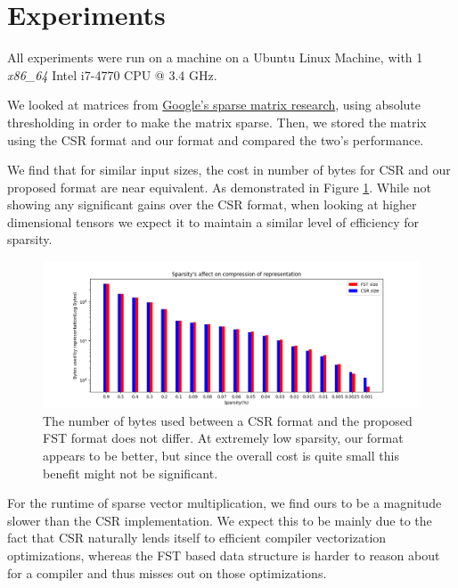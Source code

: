 \documentclass[12pt]{article}
\begin{document}

\section*{Experiments}

All experiments were run on a machine on a Ubuntu Linux Machine, with 1 \textit{x86\_64} Intel
i7-4770 CPU @ 3.4 GHz.

We looked at matrices from
\href{https://github.com/google-research/google-research/tree/master/state_of_sparsity}{Google's
sparse matrix research}, using absolute thresholding in order to make the matrix sparse. Then,
we stored the matrix using the CSR format and our format and compared the two's performance.

We find that for similar input sizes, the cost in number of bytes for CSR and our proposed
format are near equivalent. As demonstrated in Figure \ref{fig:sparsity}. While not showing any
significant gains over the CSR format, when looking at higher dimensional tensors we expect it
to maintain a similar level of efficiency for sparsity.

\begin{center}
\begin{figure}
  \includegraphics[width=\textwidth]{sparsity}
  \caption{The number of bytes used between a CSR format and the proposed FST format does not
differ. At extremely low sparsity, our format appears to be better, but since the overall
cost is quite small this benefit might not be significant.}
  \label{fig:sparsity}
\end{figure}
\end{center}

For the runtime of sparse vector multiplication, we find ours to be a magnitude slower than the
CSR implementation. We expect this to be mainly due to the fact that CSR naturally lends itself
to efficient compiler vectorization optimizations, whereas the FST based data structure is
harder to reason about for a compiler and thus misses out on those optimizations.
\end{document}
